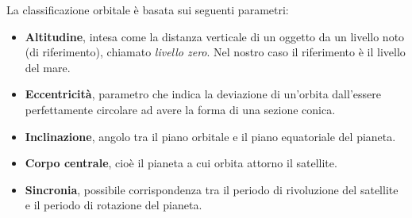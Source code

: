 \documentclass[12pt,a4paper,oneside]{book}
\begin{document}
			La classificazione orbitale è basata sui seguenti parametri:
			\begin{itemize}
				\item \textbf{Altitudine}, intesa come la distanza verticale di un oggetto da un livello noto (di riferimento), chiamato \textit{livello zero}. Nel nostro caso il riferimento è il livello del mare.
				
				\item \textbf{Eccentricità}, parametro che indica la deviazione di un'orbita dall'essere perfettamente circolare ad avere la forma di una sezione conica. 
				
				\item \textbf{Inclinazione}, angolo tra il piano orbitale e il piano equatoriale del pianeta.
				
				\item \textbf{Corpo centrale}, cioè il pianeta a cui orbita attorno il satellite.
				
				\item \textbf{Sincronia}, possibile corrispondenza tra il periodo di rivoluzione del satellite e il periodo di rotazione del pianeta.
			\end{itemize}
\end{document}
